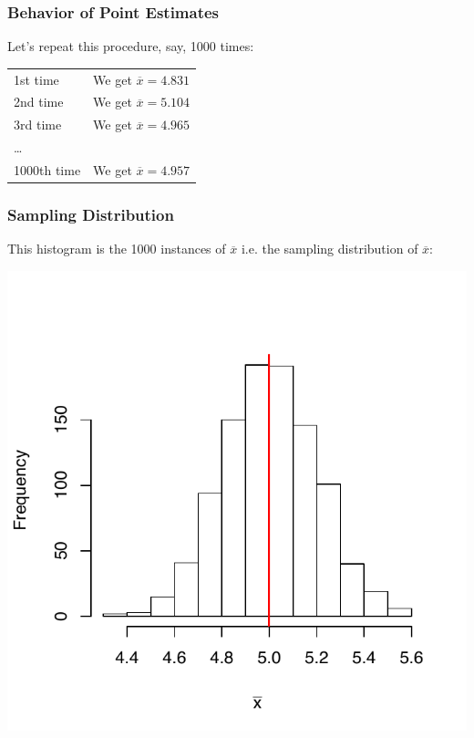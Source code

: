 \documentclass[slides]{beamer}
\newcommand{\blue}[1]{\textcolor{blue2}{#1}}
\newcommand{\xbar}{\overline{x}}
\begin{document}
\begin{frame}[fragile]
\frametitle{Behavior of Point Estimates}
Let's repeat this procedure, say, 1000 times:

\pause \begin{center}
\begin{tabular}{ll}
1st time & We get $\overline{x}=4.831$\\
2nd time & We get $\overline{x}=5.104$\\
3rd time & We get $\overline{x}=4.965$\\
\ldots & \\
1000th time & We get $\overline{x}=4.957$\\
\end{tabular}
\end{center}

\end{frame}


\begin{frame}[fragile]
\frametitle{Sampling Distribution}
This histogram is the 1000 instances of $\xbar$ i.e. the \blue{sampling distribution} of $\xbar$:
\begin{center}
\includegraphics{figure/lec12-001}
\end{center}
\end{frame}
\end{document}
